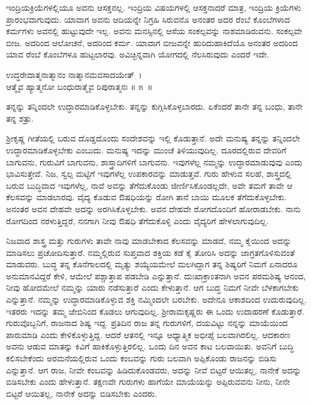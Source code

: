 ಇಂದ್ರಿಯಕ್ರಿಯೆಗಳಲ್ಲಿಯೂ ಅವನು ಆಸಕ್ತನಲ್ಲ. ಇಂದ್ರಿಯ ವಿಷಯಗಳಲ್ಲಿ ಆಸಕ್ತನಾದರೆ ಮಾತ್ರ, ಇಂದ್ರಿಯ ಕ್ರಿಯೆಗಳು ಪ್ರಾರಂಭವಾಗುವುದು. ಯಾವಾಗ ಅವನು ಆದಿಯನ್ನೇ ನಿಗ್ರಹಿ ಸಿರುವನೊ ಅನಂತರ ಅದರ ರೆಂಬೆ ಕೊಂಬೆಗಳಾದ ಕರ್ಮಗಳು ಅವನಲ್ಲಿ ಹುಟ್ಟುವುದೇ ಇಲ್ಲ. ಅವನು ಮನಸ್ಸಿನಲ್ಲಿ ಆಸೆಯ ಸಂಕಲ್ಪವನ್ನು ನಾಶಮಾಡಿರುವನು. ಸಂಕಲ್ಪವೇ ಬೀಜ. ಅದರಿಂದ ಆಲೋಚನೆ, ಅದರಿಂದ ಕರ್ಮ. ಯಾವಾಗ ಬೀಜವನ್ನೇ ಹುರಿದುಹಾಕಿದೆಯೊ ಅನಂತರ ಅದರಿಂದ ಯಾವ ರೆಂಬೆ ಕೊಂಬೆಗಳೂ ಹುಟ್ಟಲಾರವು. ಅವಿಚ್ಛಿನ್ನವಾಗಿ ಯೋಗದಲ್ಲಿ ನೆಲಸಿರುವುದು ಎಂದರೆ ಇದೇ.

\begin{shloka}
ಉದ್ಧರೇದಾತ್ಮನಾತ್ಮಾನಂ ನಾತ್ಮಾನಮವಸಾದಯೇತ್~।\\ಆತ್ಮೈವ ಹ್ಯಾತ್ಮನೋ ಬಂಧುರಾತ್ಮೈವ ರಿಪುರಾತ್ಮನಃ \hfill॥ ೫~॥
\end{shloka}

\begin{artha}
ತನ್ನನ್ನು ತನ್ನಿಂದಲೇ ಉದ್ಧಾರಮಾಡಿಕೊಳ್ಳಬೇಕು. ತನ್ನನ್ನು ಕುಗ್ಗಿಸಿಕೊಳ್ಳಬಾರದು. ಏಕೆಂದರೆ ತಾನೇ ತನ್ನ ಬಂಧು, ತಾನೇ ತನ್ನ ಶತ್ರು.
\end{artha}

ಶ‍್ರೀಕೃಷ್ಣ ಗೀತೆಯಲ್ಲಿ ಬರುವ ದೊಡ್ಡದೊಂದು ಸಂದೇಶವನ್ನು ಇಲ್ಲಿ ಕೊಡುತ್ತಾನೆ. ಅದೇ ಮನುಷ್ಯ ತನ್ನನ್ನು ತನ್ನಿಂದಲೇ ಉದ್ಧಾರಮಾಡಿಕೊಳ್ಳಬೇಕು ಎಂಬುದು. ಮನುಷ್ಯ ಇದನ್ನು ಮುಂಚೆ ತಿಳಿಯುವುದಿಲ್ಲ. ದೂರದಲ್ಲಿರುವ ದೇವರಿಗೆ ಬಾಗುವನು, ಗುರುವಿಗೆ ಬಾಗುವನು, ಶಾಸ್ತ್ರಾದಿಗಳಿಗೆ ಬಾಗುವನು. ಇವುಗಳೆಲ್ಲ ನಮ್ಮನ್ನು ಉದ್ಧಾರಮಾಡುವುವು ಎಂದು ಭಾವಿಸುತ್ತೇವೆ. ನಿಜ, ಸ್ವಲ್ಪ ಮಟ್ಟಿಗೆ ಇವುಗಳೆಲ್ಲ ಉಪಕಾರವನ್ನು ಮಾಡುತ್ತವೆ. ಗುರು ಹೇಳುವ ಸಲಹೆ, ಶಾಸ್ತ್ರದಲ್ಲಿ ಬರುವ ಬುದ್ಧಿವಾದ ಇವುಗಳೆಲ್ಲ, ನಾವೆ ಅವನ್ನು ತೆಗೆದುಕೊಂಡು ಜೀರ್ಣಿಸಿಕೊಂಡಲ್ಲದೇ, ಅವೇ ತಮಗೆ ತಾವೇ ಆ ಕೆಲಸವನ್ನು ಮಾಡಲಾರವು. ವೈದ್ಯ ಕೊಡುವ ಔಷಧಿಯನ್ನು ರೋಗಿ ತಾನೆ ಬಾಯಿ ಮೂಲಕ ತೆಗೆದುಕೊಳ್ಳಬೇಕು. ಅನಂತರ ಅವನ ದೇಹವೇ ಅದನ್ನು ಅರಗಿಸಿಕೊಳ್ಳಬೇಕು. ಅವನ ದೇಹವೇ ರೋಗದೊಂದಿಗೆ ಹೋರಾಡಬೇಕು. ನಾನು ರೋಗದಿಂದ ನರಳುತ್ತಿದ್ದರೆ, ನನಗಾಗಿ ನೀವು ಔಷಧಿ ತೆಗೆದುಕೊಳ್ಳಿ ಎಂದು ವೈದ್ಯರಿಗೆ ಹೇಳಲಾಗುವುದಿಲ್ಲ.

ನಿಜವಾದ ಶಾಸ್ತ್ರ ಮತ್ತು ಗುರುಗಳು ತಾವೇ ನಾವು ಮಾಡಬೇಕಾದ ಕೆಲಸವನ್ನು ಮಾಡದೆ, ನಮ್ಮ ಕೈಯಿಂದ ಅದನ್ನು ಮಾಡಿಸಲು ಪ್ರಚೋದಿಸುತ್ತಾರೆ. ನಮ್ಮಲ್ಲಿರುವ ಸುಪ್ತವಾದ ಶಕ್ತಿಯ ಕಡೆ ಕೈ ತೋರಿಸಿ ಅದನ್ನು ಜಾಗ್ರತಗೊಳಿಸುವಂತೆ ಮಾಡುವರು. ಬುದ್ಧ ತನ್ನ ಕೊನೆಗಾಲದಲ್ಲಿ ಮೃತ್ಯು ಶಯ್ಯೆಯಮೇಲೆ ಮಲಗಿದ್ದಾಗ ತನ್ನ ಶಿಷ್ಯರಿಗೆ ನಿಮಗೆ ಏನಾದರೂ ಅನುಮಾನವಿದ್ದರೆ ಕೇಳಿ, ಆಮೇಲೆ ಪಶ್ಚಾತ್ತಾಪ ಪಡಬೇಡಿ ಎನ್ನುತ್ತಾನೆ. ದುಃಖಾಕ್ರಾಂತನಾಗಿ ಅವನ ಪರಮಶಿಷ್ಯ ಆನಂದ, ನೀವು ಹೋದಮೇಲೆ ನಮ್ಮನ್ನು ಯಾರು ನಡೆಸುತ್ತಾರೆ ಎಂದು ಕೇಳುತ್ತಾನೆ. ಆಗ ಬುದ್ಧ ನಿಮಗೆ ನೀವೇ ಬೆಳಕಾಗಬೇಕು ಎನ್ನುತ್ತಾನೆ. ನಮ್ಮನ್ನು ಉದ್ಧಾರಮಾಡಿಕೊಳ್ಳುವ ಶಕ್ತಿ ನಮ್ಮಿಂದಲೇ ಬರಬೇಕು. ಅದೇನೂ ಆಕಾಶದಿಂದ ಉದುರುವುದಿಲ್ಲ. ಇತರರು ಇದನ್ನು ತಮ್ಮ ಜೇಬಿನಿಂದ ಕೊಡಲು ಆಗುವುದಿಲ್ಲ. ಶ‍್ರೀರಾಮಕೃಷ್ಣರು ಈ ಒಂದು ಉದಾಹರಣೆ ಕೊಡುತ್ತಾರೆ. ಗುರುವೊಬ್ಬನಿಗೆ, ರಾಜನಾದ ಶಿಷ್ಯ ಇದ್ದ. ಪ್ರತಿದಿನ ರಾಜ ತನ್ನ ಗುರುಗಳಿಗೆ, ದಯವಿಟ್ಟು ನನ್ನನ್ನು ಮಾಯೆಯಿಂದ ಪಾರುಮಾಡಿ ಎಂದು ಕೇಳಿಕೊಳ್ಳುತ್ತಿದ್ದ. ಆದರೆ ಆತನಲ್ಲಿ ಇನ್ನೂ ಆಧ್ಯಾತ್ಮಿಕ ಅಭೀಪ್ಸೆ ಬಲವಾಗಿರಲಿಲ್ಲ. ಆದಕಾರಣ ಅವನು ಆಡುವ ಮಾತನ್ನು ಕಿವಿಗೆ ಹಾಕಿಕೊಳ್ಳುತ್ತಿರಲಿಲ್ಲ. ಒಂದು ದಿನ ಅವನ ಕಾಟ ಬಲವಾಯಿತು. ಅವನಿಗೆ ಬುದ್ಧಿ ಕಲಿಸಬೇಕೆಂದು ಅರಮನೆಯಲ್ಲಿರುವ ಒಂದು ಕಂಬವನ್ನು ಗುರು ಬಲವಾಗಿ ಅಪ್ಪಿಕೊಂಡು ರಾಜನನ್ನು ಬಿಡಿಸು ಎನ್ನುತ್ತಾನೆ. ಆಗ ರಾಜ, ನೀವೇ ಕಂಬವನ್ನು ಹಿಡಿದುಕೊಂಡವರು, ಅದನ್ನು ನೀವೆ ಬಿಟ್ಟರೆ ಆಯಿತಲ್ಲ, ನಾನೇಕೆ ಅದನ್ನು ಬಿಡಿಸಬೇಕು ಎಂದು ಹೇಳುತ್ತಾನೆ. ತಕ್ಷಣವೇ ಗುರುಗಳು ಹಾಗೆಯೇ ಮಾಯೆಯನ್ನು ಅಪ್ಪಿರುವವನು ನೀನು, ನೀನೇ ಬಿಟ್ಟರೆ ಆಯಿತಲ್ಲ, ನಾನೇಕೆ ಅದನ್ನು ಬಿಡಿಸಬೇಕು ಎಂದರು.

